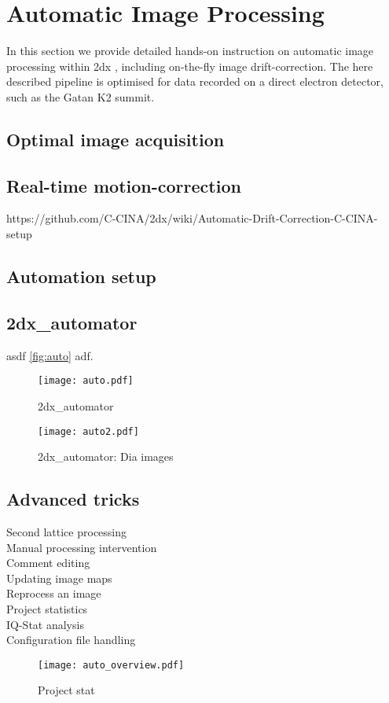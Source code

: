 \section{Automatic Image Processing}

In this section we provide detailed hands-on instruction on automatic image processing within 2dx \cite{scherer20142dx_automator}, including on-the-fly image drift-correction. The here described pipeline is optimised for data recorded on a direct electron detector, such as the Gatan K2 summit. 

\subsection{Optimal image acquisition}

\subsection{Real-time motion-correction}

https://github.com/C-CINA/2dx/wiki/Automatic-Drift-Correction-C-CINA-setup

\subsection{Automation setup}

\subsection{2dx\_automator}

asdf  \autoref{fig:auto} adf.

\begin{figure}
	\centering
	\texttt{[image: auto.pdf]}
	\caption{2dx\_automator}
	\label{fig:auto}
\end{figure}

\begin{figure}
	\centering
	\texttt{[image: auto2.pdf]}
	\caption{2dx\_automator: Dia images}
	\label{fig:auto2}
\end{figure}


\subsection{Advanced tricks}

\begin{description}
	\item [Second lattice processing]
	\item [Manual processing intervention] 
	\item [Comment editing]
	\item [Updating image maps]
	\item [Reprocess an image]
	\item [Project statistics]
	\item [IQ-Stat analysis]
	\item [Configuration file handling] 
\end{description}



\begin{figure}
	\centering
	\texttt{[image: auto\_overview.pdf]}
	\caption{Project stat}
	\label{fig:auto_stat}
\end{figure}